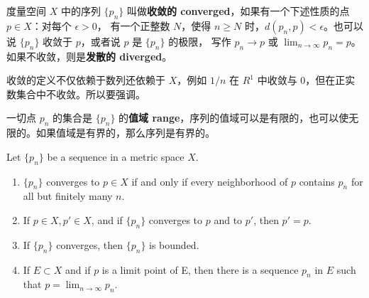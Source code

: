 \documentclass[../poma-notes.tex]{subfiles}
\begin{document}
\begin{anote}
  度量空间 $X$ 中的序列 $\{p_n\}$ 叫做\textbf{收敛的 converged}，如果有一个下述性质的点 $p \in X$：对每个 $\epsilon>0$，
  有一个正整数 $N$，使得 $n \ge N$ 时，$d(p_n,p)<\epsilon$。也可以说 $\{p_n\}$ 收敛于 $p$，或者说 $p$ 是 $\{p_n\}$ 的极限，
  写作 $p_n \to p$ 或 $\lim_{n \to \infty} p_n = p$。如果不收敛，则是\textbf{发散的 diverged}。

  收敛的定义不仅依赖于数列还依赖于 $X$，例如 ${1/n}$ 在 $R^1$ 中收敛与 $0$，但在正实数集合中不收敛。所以要强调。

  一切点 $p_n$ 的集合是 $\{p_n\}$ 的\textbf{值域 range}，序列的值域可以是有限的，也可以使无限的。如果值域是有界的，那么序列是有界的。
\end{anote}

\begin{theorem}
  Let $\{p_n\}$ be a sequence in a metric space $X$.
  \begin{enumerate}[label=(\alph*)]
    \item $\{p_n\}$ converges to $p \in X$ if and only if every neighborhood of $p$ contains $p_n$ for all but
          finitely many $n$.
    \item If $p \in X, p' \in X$, and if $\{p_n\}$ converges to $p$ and to $p'$, then $p' = p$.
    \item If $\{p_n\}$ converges, then $\{p_n\}$ is bounded.
    \item If $E \subset X$ and if $p$ is a limit point of E, then there is a sequence ${p_n}$ in $E$ such that
          $p=\lim_{n \to \infty} p_n$.
  \end{enumerate}
\end{theorem}
\end{document}
